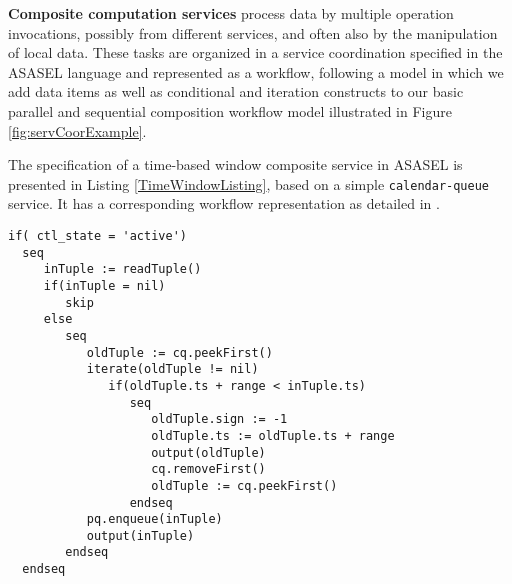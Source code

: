 \textbf{Composite computation services}  process data by multiple operation invocations, possibly from different services, and often also by the manipulation of local data. These tasks are organized in a service coordination specified in the ASASEL language and represented as a workflow, following a model in which we add data items as well as conditional and iteration constructs to our basic parallel and sequential composition workflow model illustrated in Figure \ref{fig:servCoorExample}.
		
The specification of a time-based window composite service in ASASEL is presented in Listing \ref{TimeWindowListing}, based on a simple \texttt{calendar-queue} service. It has a corresponding workflow representation as detailed in \cite{vcv}.
		
\lstset{language=AbStM,showstringspaces=false}
\begin{lstlisting}[caption={ASM specification for the time-based window},label=TimeWindowListing]
if( ctl_state = 'active')
  seq
     inTuple := readTuple()
     if(inTuple = nil)
        skip
     else
        seq
           oldTuple := cq.peekFirst()
           iterate(oldTuple != nil)
              if(oldTuple.ts + range < inTuple.ts)
                 seq
                    oldTuple.sign := -1
                    oldTuple.ts := oldTuple.ts + range
                    output(oldTuple)
                    cq.removeFirst()
                    oldTuple := cq.peekFirst()
                 endseq
           pq.enqueue(inTuple)
           output(inTuple)
        endseq
  endseq
\end{lstlisting}







		











